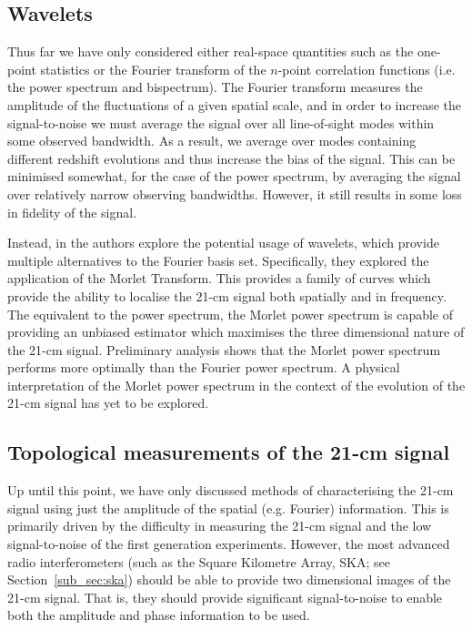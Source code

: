 \subsection{Wavelets}

Thus far we have only considered either real-space quantities such as the one-point statistics or the Fourier transform of the $n$-point correlation functions (i.e. the power spectrum and bispectrum). The Fourier transform measures the amplitude of the fluctuations of a given spatial scale, and in order to increase the signal-to-noise we must average the signal over all line-of-sight modes within some observed bandwidth. As a result, we average over modes containing different redshift evolutions and thus increase the bias of the signal. This can be minimised somewhat, for the case of the power spectrum, by averaging the signal over relatively narrow observing bandwidths. However, it still results in some loss in fidelity of the signal.

Instead, in \cite{Trott:2016} the authors explore the potential usage of wavelets, which provide multiple alternatives to the Fourier basis set. Specifically, they explored the application of the Morlet Transform. This provides a family of curves which provide the ability to localise the 21-cm signal both spatially and in frequency. The equivalent to the power spectrum, the Morlet power spectrum is capable of providing an unbiased estimator which maximises the three dimensional nature of the 21-cm signal. Preliminary analysis shows that the Morlet power spectrum performs more optimally than the Fourier power spectrum. A physical interpretation of the Morlet power spectrum in the context of the evolution of the 21-cm signal has yet to be explored.

\subsection{Topological measurements of the 21-cm signal} \label{sec:topology}

Up until this point, we have only discussed methods of characterising the 21-cm signal using just the amplitude of the spatial (e.g. Fourier) information. This is primarily driven by the difficulty in measuring the 21-cm signal and the low signal-to-noise of the first generation experiments. However, the most advanced radio interferometers (such as the Square Kilometre Array, SKA; see Section~\ref{sub_sec:ska}) should be able to provide two dimensional images of the 21-cm signal. That is, they should provide significant signal-to-noise to enable both the amplitude and phase information to be used. 

